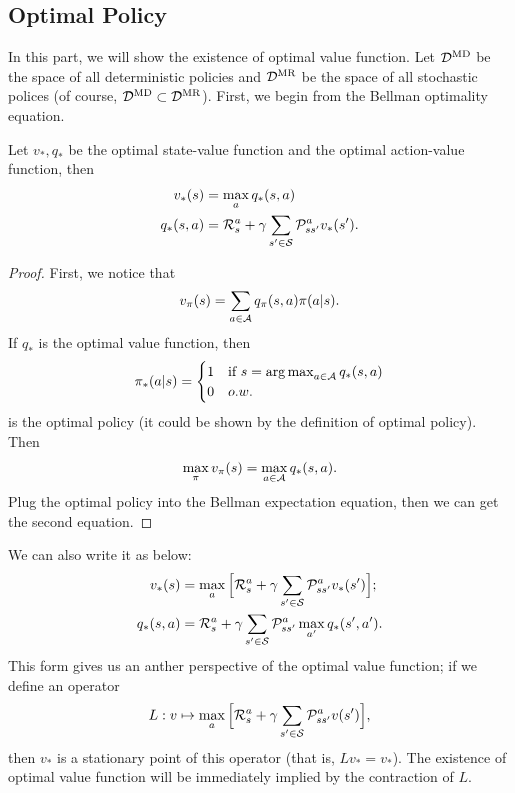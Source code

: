 \subsection*{Optimal Policy} 
In this part, we will show the existence of optimal value function. Let $\mathcal{D}^{\text{MD}}$  be the space of all deterministic policies and $\mathcal{D}^{\text{MR}}$ be the space of all stochastic polices (of course, $\mathcal{D}^{\text{MD}} \subset \mathcal{D}^{\text{MR}}$).  First, we begin from the Bellman optimality equation. 
\begin{theorem}
	\label{bellmam_optimality} Let $v_\ast, q_\ast$ be the optimal state-value function and the optimal action-value function, then
	\begin{align*}
		v_\ast(s) &= \max_a q_\ast(s,a)\\
		q_\ast(s,a) &= \mathcal{R}_s^a + \gamma \sum_{s'\in\mathcal{S}} \mathcal{P}_{ss'}^a v_\ast(s').
	\end{align*}
\end{theorem}
\begin{proof}
	First, we notice that  
	\begin{align*}
		v_\pi(s) =   \sum_{a\in \mathcal{A}} q_\pi(s,a) \pi(a|s) \label{def_of_v} .
	\end{align*}
	If $q_\ast$ is the optimal value function, then 
	\begin{align*}
	\pi_\ast(a|s) = \begin{cases}
	1 & \text{if }s= \operatorname*{arg\,max}_{a \in \mathcal{A}} q_\ast (s,a)\\
	0 & o.w.
	\end{cases} 
	\end{align*}
	is the optimal policy (it could be shown by the definition of optimal policy). Then
	\begin{align*}
		\max_\pi v_\pi(s) = \max_{a \in \mathcal{A}} q_\ast(s,a).
	\end{align*}
	Plug the optimal policy into the Bellman expectation equation, then we can get the second equation.
\end{proof}
\begin{remark} We can also write it as below:
	\begin{align*}
	v_\ast(s) &= \max_a \Big[\mathcal{R}^a_s + \gamma \sum_{s'\in\mathcal{S}} \mathcal{P}_{ss'}^a v_\ast(s')\Big]; \\
	q_\ast(s,a) &= \mathcal{R}_s^a + \gamma \sum_{s'\in\mathcal{S}} \mathcal{P}_{ss'}^a  \max_{a'} q_\ast(s', a').
	\end{align*}
	This form gives us an anther perspective of the optimal value function; if we define an operator 
	\begin{align*}
		L: v \mapsto \max_a \Big[ \mathcal{R}_s^a + \gamma \sum_{s'\in\mathcal{S}} \mathcal{P}_{ss'}^a v(s') \Big],
	\end{align*}
	then $v_\ast$ is a stationary point of this operator (that is, $Lv_\ast = v_\ast$). The existence of optimal value function will be immediately implied by the contraction of $L$.
\end{remark}

